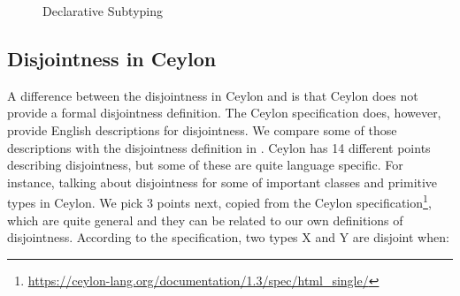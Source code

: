\begin{figure}[t]
  \caption{Declarative Subtyping}
  \label{fig:discussion:ds}
\end{figure}

\subsection{Disjointness in Ceylon}
\label{sec:discussion:ceylon}
\begin{comment}
\ningning{A similar example is used in the overview. Maybe we want to be
  consistent with the examples.}
\baber{I will make this example consistent with the example in overview. But I suppose
  I should be using Ceylon syntax in this section.}

\begin{figure}[t]
\begin{lstlisting}[xleftmargin=.2\textwidth, xrightmargin=.2\textwidth]
// Student <: Person
// speak function will not type check
void speak(Person | Student val) {
  switch (val)
  case (is Person) {print("person speaks");}
  case (is Student) {print("student speaks");} 
}
\end{lstlisting}
\caption{Ceylon disjointness code example.}
\label{discussion:list:ceylon}
\end{figure}

\noindent The function \emph{speak} in \Cref{discussion:list:ceylon} 
will not type check in Ceylon. Because \emph{Person} and
\emph{Student} are not disjoint types. \emph{Person} and \emph{Student} both have a common
subtype which is \emph{Student}. \cal will also reject such programs.
\end{comment}
A difference between the disjointness in Ceylon and \cal is that
Ceylon does not provide
a formal disjointness definition.
The Ceylon specification does, however, provide English descriptions
for disjointness. 
We compare some of those descriptions with
the disjointness definition in \cal. Ceylon has 14 different points describing
disjointness, but some of these are quite language specific. For instance, talking
about disjointness for some of important classes and primitive types in Ceylon.
We pick 3 points next, copied from the
Ceylon specification\footnote{\url{https://ceylon-lang.org/documentation/1.3/spec/html_single/}}, which are quite general and they can be related to our
own definitions of disjointness. 
According to the specification, two types X and Y are disjoint when:


